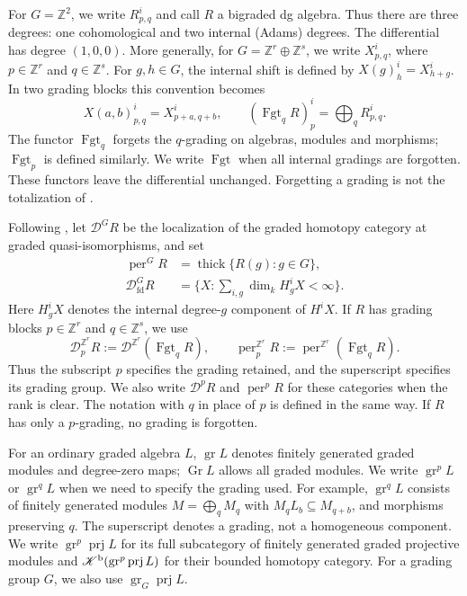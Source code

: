 \documentclass[12pt,a4paper,english,reqno]{amsart}
\theoremstyle{plain}
\theoremstyle{definition}
\numberwithin{equation}{section}
\def\prj{\operatorname{prj}}
\def\thick{\operatorname{thick}}
\def\Kb{{\mathcal K}^{\text{\rm b}}}
\def\perf{\operatorname{per}}
\def\calD{{\mathcal D}}
\def\bbZ{{\mathbb Z}}
\def\ds{\oplus}
\def\Ds{\bigoplus}
\newcommand{\Fgt}{\operatorname{Fgt}}
\def\gr{\operatorname{gr}}
\def\fd{\mathrm{fd}}
\begin{document}
For $G=\bbZ^2$, we write $R^i_{p,q}$ and call $R$ a bigraded dg
algebra. Thus there are three degrees: one cohomological and two
internal (Adams) degrees. The differential has degree $(1,0,0)$.
More generally, for $G=\bbZ^r\ds\bbZ^s$, we write
$X^i_{p,q}$, where $p\in\bbZ^r$ and $q\in\bbZ^s$.
For $g,h\in G$, the internal shift is defined by
$X(g)^i_h=X^i_{h+g}$. In two grading blocks this convention becomes
\[
 X(a,b)^i_{p,q}=X^i_{p+a,q+b},\qquad
 (\Fgt_qR)^i_p=\Ds_qR^i_{p,q}.
\]
The functor $\Fgt_q$ forgets the $q$-grading on algebras, modules
and morphisms; $\Fgt_p$ is defined similarly. We write $\Fgt$ when
all internal gradings are forgotten. These functors leave the
differential unchanged. Forgetting a grading is
not the totalization of \cite[Section 4.1]{KalckYang}.

Following \cite[Sections 4.1--4.2]{KalckYang}, let $\calD^G R$
be the localization of the graded homotopy category at graded
quasi-isomorphisms, and set
\[
 \begin{aligned}
 \perf^G R&=\thick\{R(g):g\in G\},\\
 \calD^G_{\fd}R&=\{X:\sum_{i,g}\dim_kH^i_gX<\infty\}.
 \end{aligned}
\]
Here $H^i_gX$ denotes the internal degree-$g$ component of $H^iX$.
If $R$ has grading blocks $p\in\bbZ^r$ and $q\in\bbZ^s$, we use
\[
 \calD^{\bbZ^r}_pR:=\calD^{\bbZ^r}(\Fgt_qR),\qquad
 \perf^{\bbZ^r}_pR:=\perf^{\bbZ^r}(\Fgt_qR).
\]
Thus the subscript $p$ specifies the grading retained, and the
superscript specifies its grading group. We also write
$\calD^pR$ and $\perf^pR$ for these categories when the rank is clear.
The notation with $q$ in place of $p$ is defined in the same way.
If $R$ has only a $p$-grading, no grading is forgotten.

For an ordinary graded algebra $L$, $\gr L$ denotes finitely generated
graded modules and degree-zero maps; $\operatorname{Gr}L$ allows all
graded modules. We write $\gr^pL$ or $\gr^qL$ when we need to
specify the grading used. For example, $\gr^qL$ consists of finitely
generated modules $M=\Ds_qM_q$ with $M_qL_b\subseteq M_{q+b}$,
and morphisms preserving $q$. The superscript denotes a grading,
not a homogeneous component. We write $\gr^p\prj L$ for its full
subcategory of finitely generated graded projective modules and
$\Kb(\gr^p\prj L)$ for their bounded homotopy category.
For a grading group $G$, we also use $\gr_G\prj L$.
\end{document}
